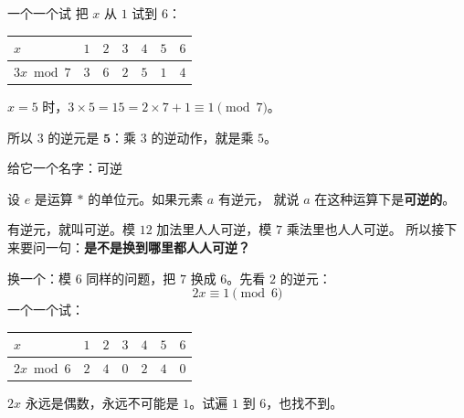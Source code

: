 \documentclass[10pt]{beamer}
\begin{document}
\begin{frame}{一个一个试}
  把 \(x\) 从 \(1\) 试到 \(6\)：
  \begin{center}
  \begin{tabular}{@{}lcccccc@{}}
    \toprule
    \(x\) & \(1\) & \(2\) & \(3\) & \(4\) & \(5\) & \(6\) \\
    \midrule
    \(3x \bmod 7\) & \(3\) & \(6\) & \(2\) & \(5\) & \textbf{\(1\)} & \(4\) \\
    \bottomrule
  \end{tabular}
  \end{center}
  \pause
  \begin{center}
    {\large \(x=5\) 时，\(3\times5=15=2\times7+1\equiv1\pmod7\)。}
  \end{center}
  \pause
  \begin{center}
    {\large 所以 \(3\) 的逆元是 \(\mathbf{5}\)：乘 \(3\) 的逆动作，就是乘 \(5\)。}
  \end{center}
\end{frame}

\begin{frame}{给它一个名字：可逆}
  \begin{definition}[可逆]
    设 \(e\) 是运算 \(*\) 的单位元。如果元素 \(a\) 有逆元，
    就说 \(a\) 在这种运算下是\textbf{可逆的}。
  \end{definition}
  \pause
  \begin{att}
    有逆元，就叫可逆。模 \(12\) 加法里人人可逆，模 \(7\) 乘法里也人人可逆。
    所以接下来要问一句：\textbf{是不是换到哪里都人人可逆？}
  \end{att}
\end{frame}

\begin{frame}{换一个：模 6}
  同样的问题，把 \(7\) 换成 \(6\)。先看 \(2\) 的逆元：
  \[
    2x\equiv1 \pmod 6
  \]
  \pause
  一个一个试：
  \begin{center}
  \begin{tabular}{@{}lcccccc@{}}
    \toprule
    \(x\) & \(1\) & \(2\) & \(3\) & \(4\) & \(5\) & \(6\) \\
    \midrule
    \(2x \bmod 6\) & \(2\) & \(4\) & \(0\) & \(2\) & \(4\) & \(0\) \\
    \bottomrule
  \end{tabular}
  \end{center}
  \pause
  \begin{att}
    \(2x\) 永远是偶数，永远不可能是 \(1\)。试遍 \(1\) 到 \(6\)，也找不到。
  \end{att}
\end{frame}
\end{document}
